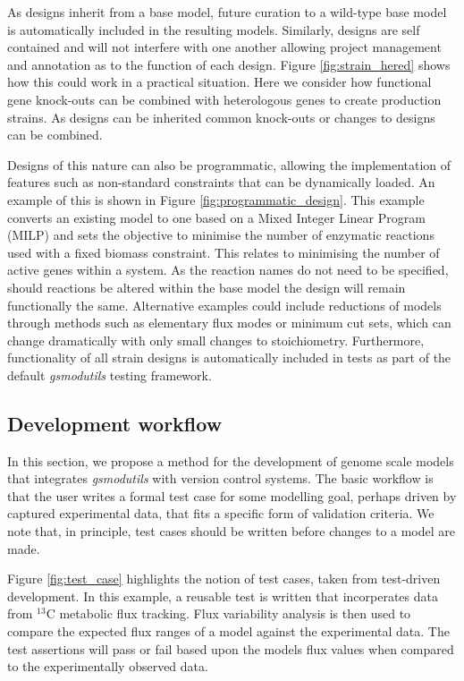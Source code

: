 \documentclass[journal=asbcd6]{achemso}
\begin{document}
As designs inherit from a base model, future curation to a wild-type base model is automatically included in the resulting models.
Similarly, designs are self contained and will not interfere with one another allowing project management and annotation as to the function of each design.
Figure \ref{fig:strain_hered} shows how this could work in a practical situation.
Here we consider how functional gene knock-outs can be combined with heterologous genes to create production strains.
As designs can be inherited common knock-outs or changes to designs can be combined.

Designs of this nature can also be programmatic, allowing the implementation of features such as non-standard constraints that can be dynamically loaded.
An example of this is shown in Figure \ref{fig:programmatic_design}.
This example converts an existing model to one based on a Mixed Integer Linear Program (MILP) and sets the objective to minimise the number of enzymatic reactions used with a fixed biomass constraint.
This relates to minimising the number of active genes within a system.
As the reaction names do not need to be specified, should reactions be altered within the base model the design will remain functionally the same.
Alternative examples could include reductions of models through methods such as elementary flux modes or minimum cut sets, which can change dramatically with only small changes to stoichiometry.
Furthermore, functionality of all strain designs is automatically included in tests as part of the default \textit{gsmodutils} testing framework.

\subsection{Development workflow}
In this section, we propose a method for the development of genome scale models that 
integrates \textit{gsmodutils} with version control systems.
The basic workflow is that the user writes a formal test case for some modelling goal, perhaps driven by captured experimental data, that fits a specific form of validation criteria.
We note that, in principle, test cases should be written before changes to a model are made.

Figure \ref{fig:test_case} highlights the notion of test cases, taken from test-driven development.
In this example, a reusable test is written that incorperates data from $^{13}$C metabolic flux tracking.
Flux variability analysis is then used to compare the expected flux ranges of a model against the experimental data.
The test assertions will pass or fail based upon the models flux values when compared to the experimentally observed data.
\end{document}
